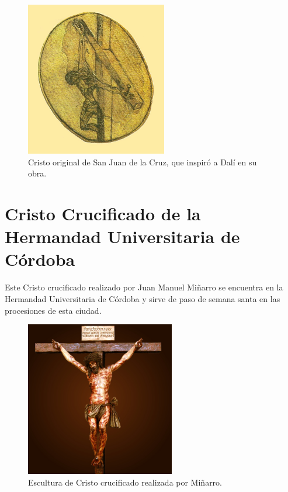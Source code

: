 \begin{figure}[H]
    \centering
    \includegraphics[width=0.55\textwidth]{sanju.jpg}
    \caption{Cristo original de San Juan de la Cruz, que inspiró a Dalí en su obra.\cite{RefWorks:44}} %
\end{figure}

\section{Cristo Crucificado de la Hermandad Universitaria de Córdoba} \label{app:crucificadominarro}

Este Cristo crucificado realizado por Juan Manuel Miñarro se encuentra en la Hermandad Universitaria de Córdoba y sirve de paso de semana santa en las procesiones de esta ciudad.

\begin{figure}[H]
    \centering
    \includegraphics[width=0.58\textwidth]{crucificadominarro.jpg}
    \caption{Escultura de Cristo crucificado realizada por Miñarro.\cite{RefWorks:70}} %
\end{figure}

